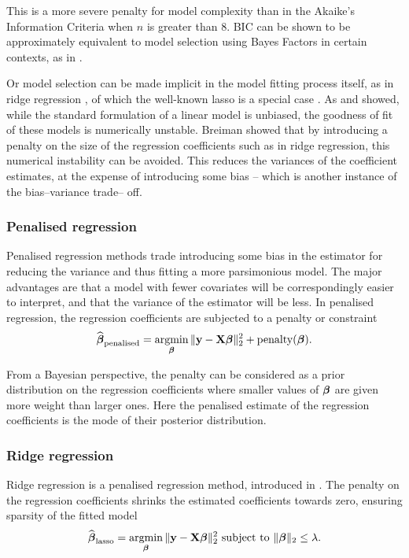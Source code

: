 \noindent This is a more severe penalty for model complexity than in the Akaike's Information Criteria when
$n$ is greater than $8$. BIC can be shown to be approximately equivalent to model selection using Bayes
Factors in certain contexts, as in \cite{Kass1993}.

Or model selection can be made implicit in the model fitting process itself, as in ridge regression
\citep{Casella1980}, of which the well-known lasso is a special case \citep{Tibshirani1996}. As
\citep{Breiman1996} and \citep{Efron2013} showed, while  the standard formulation of a linear model is
unbiased, the goodness of fit of these models is numerically  unstable. Breiman showed that by introducing a
penalty on the size of the regression coefficients such as  in ridge regression, this numerical instability
can be avoided. This reduces the variances of the coefficient estimates, at the expense of introducing some
bias -- which is another instance of the bias--variance trade-- off.

\subsubsection{Penalised regression}
Penalised regression methods trade introducing some bias in the estimator for reducing the variance and thus
fitting a more parsimonious model. The major advantages are that a model with fewer covariates will be
correspondingly easier to interpret, and that the variance of the estimator will be less. In penalised
regression, the regression coefficients are subjected to a penalty or constraint
$$
\widehat{\vbeta}_{\text{penalised}} = \argmin_\vbeta \|\vy - \mX \vbeta\|_2^2 + \text{penalty}(\vbeta).
$$

From a Bayesian perspective, the penalty can be considered as a prior distribution on the regression 
coefficients where smaller values of ${\boldsymbol \beta}$ are given more weight than larger ones. Here the penalised
estimate of the regression coefficients is the mode of their posterior distribution.

\subsubsection{Ridge regression}
Ridge regression is a penalised regression method, introduced in \cite{Hoerl1970}. The penalty on the
regression coefficients shrinks the estimated coefficients towards zero, ensuring sparsity of the fitted
model
$$
\widehat{\vbeta}_{\text{lasso}} = \argmin_\vbeta \|\vy - \mX \vbeta\|_2^2 \text{ subject to } \|\vbeta\|_2 \leq \lambda.
$$

